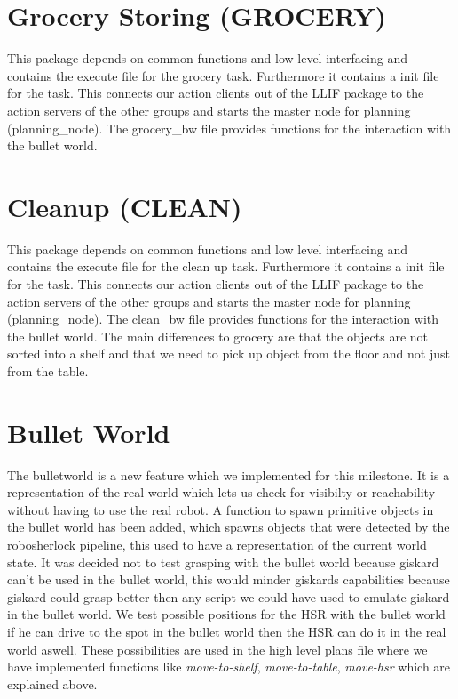 \documentclass[main.tex]{subfiles}
\begin{document}
                \section{Grocery Storing (GROCERY)}
                This package depends on common functions and low level interfacing and contains the execute file for the grocery task. Furthermore it contains a init file for the task. This connects our action clients out of the LLIF package to the action servers of the other groups and starts the master node for planning (planning\_node). The grocery\_bw file provides functions for the interaction with the bullet world.
                
                \section{Cleanup (CLEAN)}
This package depends on common functions and low level interfacing and contains the execute file for the clean up task. Furthermore it contains a init file for the task. This connects our action clients out of the LLIF package to the action servers of the other groups and starts the master node for planning (planning\_node). The clean\_bw file provides functions for the interaction with the bullet world.
The main differences to grocery are that the objects are not sorted into a shelf and that we need to pick up object from the floor and not just from the table.
                \section{Bullet World}
	                The bulletworld is a new feature which we implemented for this milestone. It is a representation of the real world which lets us check for visibilty or reachability without having to use the real robot. A function to spawn primitive objects in the bullet world has been added, which spawns objects that were detected by the robosherlock pipeline, this used to have a representation of the current world state. It was decided not to test grasping with the bullet world because giskard can't be used in the bullet world, this would minder giskards capabilities because giskard could grasp better then any script we could have used to emulate giskard in the bullet world. We test possible positions for the HSR with the bullet world if he can drive to the spot in the bullet world then the HSR can do it in the real world aswell. These possibilities are used in the high level plans file where we have implemented functions like \textit{move-to-shelf}, \textit{move-to-table}, \textit{move-hsr} which are explained above.
                
\end{document}
